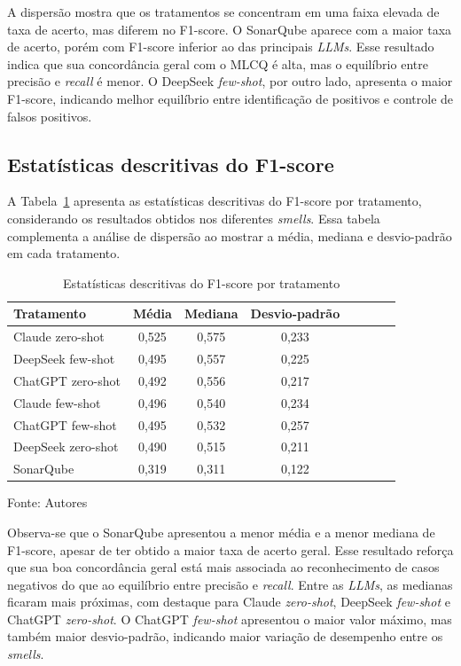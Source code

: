 A dispersão mostra que os tratamentos se concentram em uma faixa elevada de taxa de acerto, mas diferem no F1-score. 
O SonarQube aparece com a maior taxa de acerto, porém com F1-score inferior ao das principais \textit{LLMs}. Esse resultado indica 
que sua concordância geral com o MLCQ é alta, mas o equilíbrio entre precisão e \textit{recall} é menor. O DeepSeek \textit{few-shot}, por outro lado, 
apresenta o maior F1-score, indicando melhor equilíbrio entre identificação de positivos e controle de falsos positivos.

\subsection{Estatísticas descritivas do F1-score}

A Tabela~\ref{tab:descritiva-f1-tratamento} apresenta as estatísticas descritivas do F1-score por tratamento, 
considerando os resultados obtidos nos diferentes \textit{smells}. Essa tabela complementa a análise de dispersão 
ao mostrar a média, mediana e desvio-padrão em cada tratamento.

\begin{table}[H]
\centering
\caption{Estatísticas descritivas do F1-score por tratamento}
\label{tab:descritiva-f1-tratamento}
\begin{tabular}{lccccccc}
\hline
Tratamento & Média & Mediana & Desvio-padrão\\
\hline
Claude zero-shot & 0,525 & 0,575 & 0,233\\
DeepSeek few-shot & 0,495 & 0,557 & 0,225\\
ChatGPT zero-shot & 0,492 & 0,556 & 0,217\\
Claude few-shot & 0,496 & 0,540 & 0,234\\
ChatGPT few-shot & 0,495 & 0,532 & 0,257\\
DeepSeek zero-shot & 0,490 & 0,515 & 0,211\\
SonarQube & 0,319 & 0,311 & 0,122\\
\hline
\end{tabular}

Fonte: Autores
\end{table}

Observa-se que o SonarQube apresentou a menor média e a menor mediana de F1-score, apesar de ter obtido a maior taxa de acerto geral. 
Esse resultado reforça que sua boa concordância geral está mais associada ao reconhecimento de casos negativos do que ao equilíbrio 
entre precisão e \textit{recall}. Entre as \textit{LLMs}, as medianas ficaram mais próximas, com destaque para Claude \textit{zero-shot}, DeepSeek \textit{few-shot} 
e ChatGPT \textit{zero-shot}. O ChatGPT \textit{few-shot} apresentou o maior valor máximo, mas também maior desvio-padrão, indicando maior variação de 
desempenho entre os \textit{smells}.

